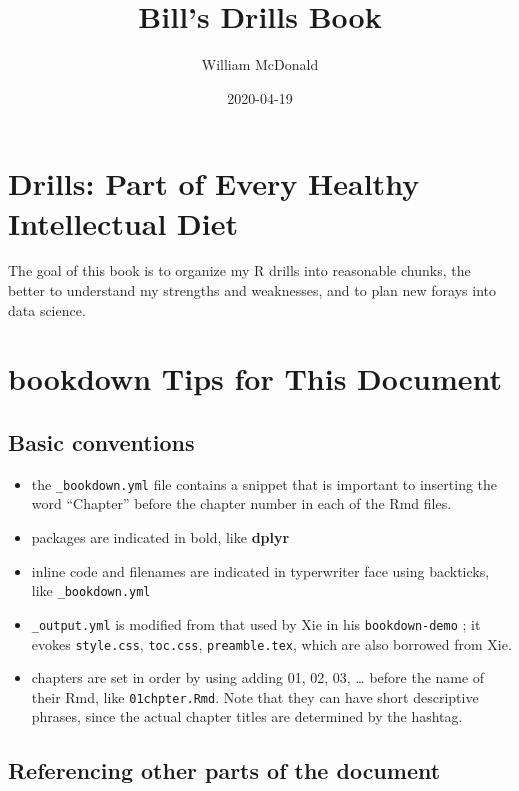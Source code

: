 \documentclass[]{book}
\title{Bill's Drills Book}
\author{William McDonald}
\date{2020-04-19}
\providecommand{\tightlist}{%
  \setlength{\itemsep}{0pt}\setlength{\parskip}{0pt}}
\begin{document}
\maketitle

{
\setcounter{tocdepth}{1}
\tableofcontents
}
\hypertarget{intro}{%
\chapter{Drills: Part of Every Healthy Intellectual Diet}\label{intro}}

The goal of this book is to organize my R drills into reasonable chunks, the better to understand my strengths and weaknesses, and to plan new forays into data science.

\hypertarget{bookdownplan}{%
\chapter{bookdown Tips for This Document}\label{bookdownplan}}

\hypertarget{basic-conventions}{%
\section{Basic conventions}\label{basic-conventions}}

\begin{itemize}
\tightlist
\item
  the \texttt{\_bookdown.yml} file contains a snippet that is important to inserting the word ``Chapter'' before the chapter number in each of the Rmd files.
\item
  packages are indicated in bold, like \textbf{dplyr}
\item
  inline code and filenames are indicated in typerwriter face using backticks, like \texttt{\_bookdown.yml}
\item
  \texttt{\_output.yml} is modified from that used by Xie in his \texttt{bookdown-demo} \citep{R-bookdown}; it evokes \texttt{style.css}, \texttt{toc.css}, \texttt{preamble.tex}, which are also borrowed from Xie.
\item
  chapters are set in order by using adding 01, 02, 03, \ldots{} before the name of their Rmd, like \texttt{01chpter.Rmd}. Note that they can have short descriptive phrases, since the actual chapter titles are determined by the hashtag.
\end{itemize}

\hypertarget{referencing-other-parts-of-the-document}{%
\section{Referencing other parts of the document}\label{referencing-other-parts-of-the-document}}
\end{document}
